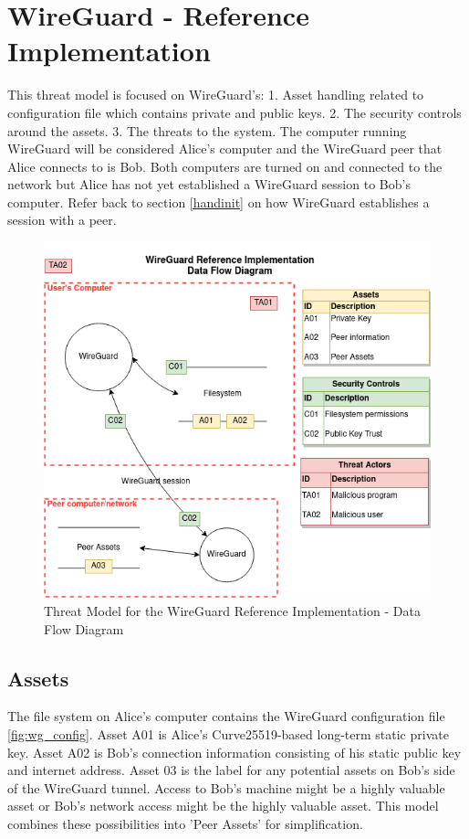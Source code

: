 \documentclass [11pt, proquest] {uwthesis}[2020/02/24]
\begin{document}
\section {WireGuard - Reference Implementation}
\label{wg-ref-analysis}
This threat model is focused on WireGuard's: 1. Asset handling related to configuration file which contains private and public keys. 2. The security controls around the assets. 3. The threats to the system. 
The computer running WireGuard will be considered Alice's computer and the WireGuard peer that Alice connects to is Bob. Both computers are turned on and connected to the network but Alice has not yet established a WireGuard session to Bob's computer. Refer back to section \ref{handinit} on how WireGuard establishes a session with a peer. 

\begin{figure}[ht]
\includegraphics[width=14cm]{paper/images/WGH_DFD.png}
\caption{Threat Model for the WireGuard Reference Implementation - Data Flow Diagram}
\label{fig:wg_ref_dfd}
\end{figure}

\subsection{Assets}
The file system on Alice's computer contains the WireGuard configuration file \ref{fig:wg_config}. 
Asset A01 is Alice's Curve25519-based long-term static private key. Asset A02 is Bob's connection information consisting of his static public key and internet address. 
Asset 03 is the label for any potential assets on Bob's side of the WireGuard tunnel. Access to Bob's machine might be a highly valuable asset or Bob's network access might be the highly valuable asset. This model combines these possibilities into 'Peer Assets' for simplification.
\end{document}
